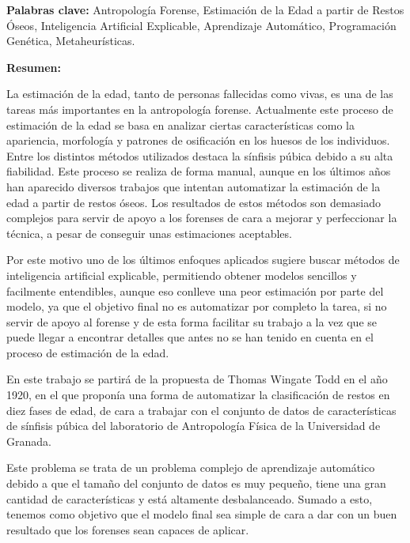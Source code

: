 \clearpage
\begin{center}
	{\large\textbf{\thetitle}}


	\theauthor
\end{center}

\textbf{Palabras clave:} Antropología Forense, Estimación de la Edad a partir de Restos Óseos, Inteligencia Artificial Explicable,
Aprendizaje Automático, Programación Genética, Metaheurísticas.

\textbf{Resumen:}

La estimación de la edad, tanto de personas fallecidas como vivas, es una de las tareas más importantes en la antropología forense. Actualmente este proceso de estimación de la edad se basa en analizar ciertas características como la apariencia, morfología y patrones de osificación en los huesos de los individuos. Entre los distintos métodos utilizados destaca la sínfisis púbica debido a su alta fiabilidad. Este proceso se realiza de forma manual, aunque en los últimos años han aparecido diversos trabajos que intentan automatizar la estimación de la edad a partir de restos óseos. Los resultados de estos métodos son demasiado complejos para servir de apoyo a los forenses de cara a mejorar y perfeccionar la técnica, a pesar de conseguir unas estimaciones aceptables.

Por este motivo uno de los últimos enfoques aplicados sugiere buscar métodos de inteligencia artificial explicable, permitiendo obtener modelos sencillos y facilmente entendibles, aunque eso conlleve una peor estimación por parte del modelo, ya que el objetivo final no es automatizar por completo la tarea, si no servir de apoyo al forense y de esta forma facilitar su trabajo a la vez que se puede llegar a encontrar detalles que antes no se han tenido en cuenta en el proceso de estimación de la edad.

En este trabajo se partirá de la propuesta de Thomas Wingate Todd en el año 1920, en el que proponía una forma de automatizar la clasificación de restos en diez fases de edad, de cara a trabajar con el conjunto de datos de características de sínfisis púbica del laboratorio de Antropología Física de la Universidad de Granada.

Este problema se trata de un problema complejo de aprendizaje automático debido a que el tamaño del conjunto de datos es muy pequeño, tiene una gran cantidad de características y está altamente desbalanceado. Sumado a esto, tenemos como objetivo que el modelo final sea simple de cara a dar con un buen resultado que los forenses sean capaces de aplicar.

